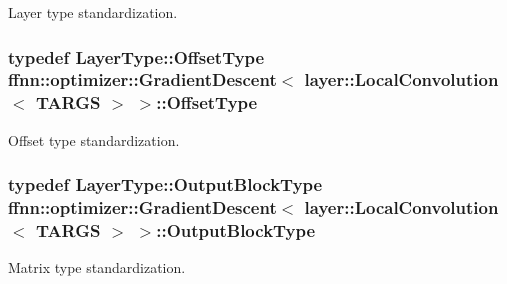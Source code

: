 Layer type standardization. 

\hypertarget{classffnn_1_1optimizer_1_1_gradient_descent_3_01layer_1_1_local_convolution_3_01_t_a_r_g_s_01_4_01_4_aef03166f60cff06f14ed5e36cf371a5e}{
\subsubsection[{Offset\-Type}]{\setlength{\rightskip}{0pt plus 5cm}typedef Layer\-Type\-::\-Offset\-Type {\bf ffnn\-::optimizer\-::\-Gradient\-Descent}$<$ layer\-::\-Local\-Convolution$<$ {\bf T\-A\-R\-G\-S} $>$ $>$\-::{\bf Offset\-Type}}}\label{classffnn_1_1optimizer_1_1_gradient_descent_3_01layer_1_1_local_convolution_3_01_t_a_r_g_s_01_4_01_4_aef03166f60cff06f14ed5e36cf371a5e}


Offset type standardization. 

\hypertarget{classffnn_1_1optimizer_1_1_gradient_descent_3_01layer_1_1_local_convolution_3_01_t_a_r_g_s_01_4_01_4_aa20bbed306ab91d1e49da41491764c11}{
\subsubsection[{Output\-Block\-Type}]{\setlength{\rightskip}{0pt plus 5cm}typedef Layer\-Type\-::\-Output\-Block\-Type {\bf ffnn\-::optimizer\-::\-Gradient\-Descent}$<$ layer\-::\-Local\-Convolution$<$ {\bf T\-A\-R\-G\-S} $>$ $>$\-::{\bf Output\-Block\-Type}}}\label{classffnn_1_1optimizer_1_1_gradient_descent_3_01layer_1_1_local_convolution_3_01_t_a_r_g_s_01_4_01_4_aa20bbed306ab91d1e49da41491764c11}


Matrix type standardization. 


